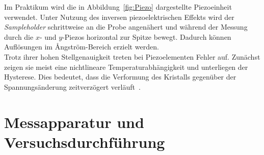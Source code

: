 \documentclass[a4paper,twoside,final]{article}
\begin{document}
Im Praktikum wird die in Abbildung~\ref{fig:Piezo} dargestellte Piezoeinheit verwendet. Unter Nutzung des inversen piezoelektrischen Effekts wird der \textit{Sampleholder} schrittweise an die Probe angenähert und während der Messung durch die $x$- und $y$-Piezos horizontal zur Spitze bewegt. Dadurch können Auflösungen im Ångström-Bereich erzielt werden.\\
Trotz ihrer hohen Stellgenauigkeit treten bei Piezoelementen Fehler auf. Zunächst zeigen sie meist eine nichtlineare Temperaturabhängigkeit und unterliegen der Hysterese. Dies bedeutet, dass die Verformung des Kristalls gegenüber der Spannungsänderung zeitverzögert verläuft~\cite{Versuchsanleitung}.

\section{Messapparatur und Versuchsdurchführung} \label{sec:Versuchsdurchführung}
\end{document}
